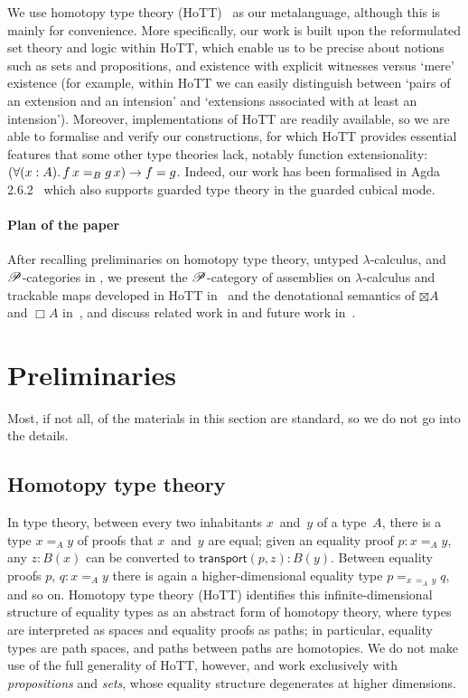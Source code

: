 \documentclass[a4paper,UKenglish,numberwithinsect,cleveref,thm-restate]{lipics-v2021}
\numberwithin{equation}{section}
\theoremstyle{definition}
\theoremstyle{plain}
\begin{document}
We use homotopy type theory (HoTT)~\cite{hottbook} as our metalanguage, although this is mainly for convenience.
More specifically, our work is built upon the reformulated set theory and logic within HoTT, which enable us to be precise about notions such as sets and propositions, and existence with explicit witnesses versus `mere' existence (for example, within HoTT we can easily distinguish between `pairs of an extension and an intension' and `extensions associated with at least an intension').
Moreover, implementations of HoTT are readily available, so we are able to formalise and verify our constructions, for which HoTT provides essential features that some other type theories lack, notably function extensionality: $\left(\fall{x : A} f\,x =_B g\,x\right) \to f = g$.
Indeed, our work has been formalised in Agda 2.6.2~\cite{Agda} which also supports guarded type theory in the guarded cubical mode.


\paragraph*{Plan of the paper}
After recalling preliminaries on homotopy type theory, untyped $\lambda$-calculus, and $\mathscr{P}$-categories in , we present the $\mathscr{P}$-category of assemblies on $\lambda$-calculus and trackable maps developed in HoTT in~ and the denotational semantics of $\boxtimes A$ and $\Box A$ in~, and discuss related work in  and future work in~.

\section{Preliminaries}\label{sec:preliminaries}
Most, if not all, of the materials in this section are standard, so we do not go into the details.

\subsection{Homotopy type theory}
In type theory, between every two inhabitants $x$~and~$y$ of a type~$A$, there is a type $x =_A y$ of proofs that $x$~and~$y$ are equal; given an equality proof $p : x =_A y$, any $z : B(x)$ can be converted to $\mathsf{transport}(p, z) : B(y)$.
Between equality proofs $p$, $q : x =_A y$ there is again a higher-dimensional equality type $p =_{x\,{=_A}\,y} q$, and so on.
Homotopy type theory (HoTT) identifies this infinite-dimensional structure of equality types as an abstract form of homotopy theory, where types are interpreted as spaces and equality proofs as paths; in particular, equality types are path spaces, and paths between paths are homotopies.
We do not make use of the full generality of HoTT, however, and work exclusively with \emph{propositions} and \emph{sets}, whose equality structure degenerates at higher dimensions.
\end{document}
